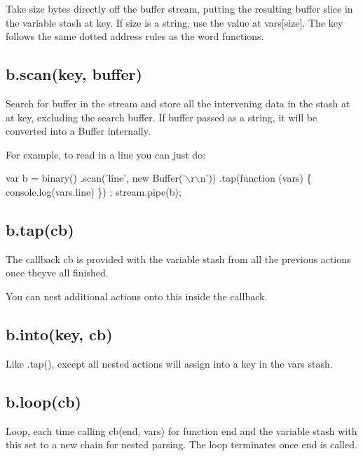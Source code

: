 Take {\ttfamily size} bytes directly off the buffer stream, putting the resulting buffer slice in the variable stash at {\ttfamily key}. If {\ttfamily size} is a string, use the value at {\ttfamily vars\mbox{[}size\mbox{]}}. The key follows the same dotted address rules as the word functions.

\subsection*{b.\+scan(key, buffer) }

Search for {\ttfamily buffer} in the stream and store all the intervening data in the stash at at {\ttfamily key}, excluding the search buffer. If {\ttfamily buffer} passed as a string, it will be converted into a Buffer internally.

For example, to read in a line you can just do\+:


\begin{DoxyCode}
var b = binary()
    .scan('line', new Buffer('\(\backslash\)r\(\backslash\)n'))
    .tap(function (vars) \{
        console.log(vars.line)
    \})
;
stream.pipe(b);
\end{DoxyCode}


\subsection*{b.\+tap(cb) }

The callback {\ttfamily cb} is provided with the variable stash from all the previous actions once they\textquotesingle{}ve all finished.

You can nest additional actions onto {\ttfamily this} inside the callback.

\subsection*{b.\+into(key, cb) }

Like {\ttfamily .tap()}, except all nested actions will assign into a {\ttfamily key} in the {\ttfamily vars} stash.

\subsection*{b.\+loop(cb) }

Loop, each time calling {\ttfamily cb(end, vars)} for function {\ttfamily end} and the variable stash with {\ttfamily this} set to a new chain for nested parsing. The loop terminates once {\ttfamily end} is called.

